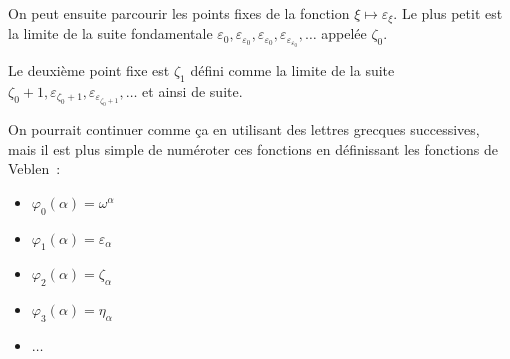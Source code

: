 \documentclass[12pt]{beamer}
\begin{document}
\begin{frame}

On peut ensuite parcourir les points fixes de la fonction \( \xi \mapsto \varepsilon_\xi \).
Le plus petit est la limite de
 la suite fondamentale \( \varepsilon_0, \varepsilon_{\varepsilon_0}, \varepsilon_{\varepsilon_0}, \varepsilon_{\varepsilon_{\varepsilon_0}}, \ldots \) appelée \( \zeta_0 \).

Le deuxième point fixe est  \( \zeta_1 \) défini comme la limite de la suite \( \zeta_0+1, \varepsilon_{\zeta_0+1}, \varepsilon_{\varepsilon_{\zeta_0+1}}, \ldots \) et ainsi de suite.

On pourrait continuer comme ça en utilisant des lettres grecques successives, mais il est plus simple de numéroter ces fonctions en définissant les fonctions de Veblen : 

\begin{itemize}
     \setlength{\itemsep}{1pt}
     \setlength{\parskip}{0pt}
     \setlength{\parsep}{0pt}
\item \( \varphi_0(\alpha) = \omega^\alpha \)
\item \(\varphi_1(\alpha) = \varepsilon_\alpha \)
\item \( \varphi_2(\alpha) = \zeta_\alpha \)
\item \( \varphi_3(\alpha) = \eta_\alpha \)
\item \( \ldots \)
\end{itemize}

\end{frame}
\end{document}
